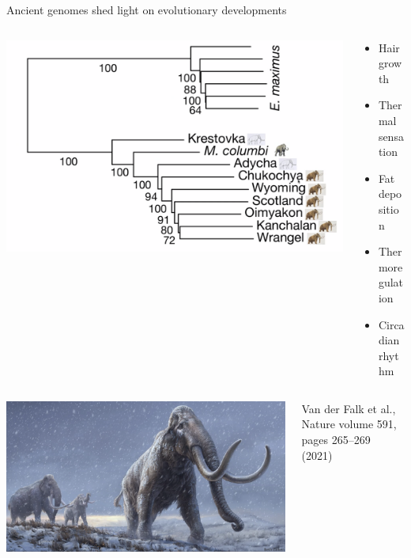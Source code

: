 \documentclass[10pt]{beamer}
\newcommand{\credit}[1]{{\vspace{\fill} \par \raggedleft \scriptsize \mdseries \color{mDarkBrown} #1 \par}}
\begin{document}
\begin{frame}{Ancient genomes shed light on evolutionary developments}
\begin{columns}
	\begin{column}{0.65\textwidth}
		\begin{center}
			\includegraphics[width=\textwidth]{./figures/mammoth_tree.png}
		\end{center}
	\end{column}
	\begin{column}{0.35\textwidth}
		\begin{itemize}
			\item Hair growth
			\item Thermal sensation
			\item Fat deposition
			\item Thermoregulation
			\item Circadian rhythm
		\end{itemize}
	\end{column}
\end{columns}
\begin{columns}
	\begin{column}{0.5\textwidth}
		\begin{center}
			\includegraphics[width=\textwidth]{./figures/mammoth.png}
	\end{center}\end{column}
	\begin{column}{0.5\textwidth}
		\vspace{3cm} 
		\credit{Van der Falk et al., Nature volume 591, pages 265–269 (2021)}
	\end{column}
\end{columns}
\end{frame}
\end{document}
